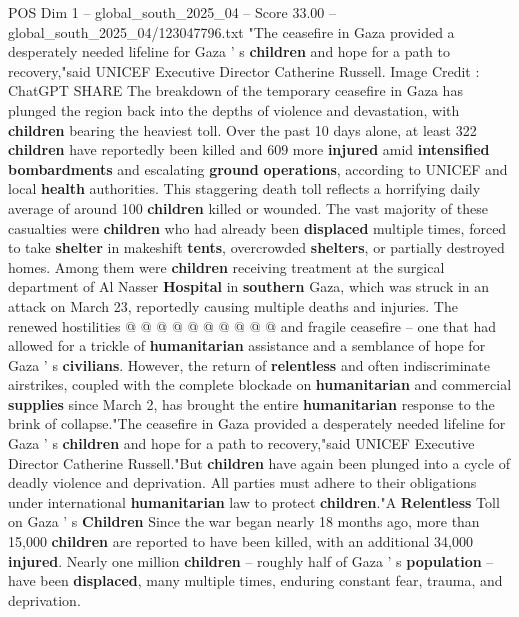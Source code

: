 \begin{textsample}{POS Dim 1 – global\_south\_2025\_04 – Score 33.00 – global\_south\_2025\_04/123047796.txt}  \label{ex:f1_pos_282}
"The ceasefire in Gaza provided a desperately needed lifeline for Gaza ' s \textbf{children} and hope for a path to recovery,"said UNICEF Executive Director Catherine Russell.
Image Credit : ChatGPT SHARE The breakdown of the temporary ceasefire in Gaza has plunged the region back into the depths of violence and devastation, with \textbf{children} bearing the heaviest toll.
Over the past 10 days alone, at least 322 \textbf{children} have reportedly been killed and 609 more \textbf{injured} amid \textbf{intensified} \textbf{bombardments} and escalating \textbf{ground} \textbf{operations}, according to UNICEF and local \textbf{health} authorities.
This staggering death toll reflects a horrifying daily average of around 100 \textbf{children} killed or wounded.
The vast majority of these casualties were \textbf{children} who had already been \textbf{displaced} multiple times, forced to take \textbf{shelter} in makeshift \textbf{tents}, overcrowded \textbf{shelters}, or partially destroyed homes.
Among them were \textbf{children} receiving treatment at the surgical department of Al Nasser \textbf{Hospital} in \textbf{southern} Gaza, which was struck in an attack on March 23, reportedly causing multiple deaths and injuries.
The renewed hostilities @ @ @ @ @ @ @ @ @ @ and fragile ceasefire -- one that had allowed for a trickle of \textbf{humanitarian} assistance and a semblance of hope for Gaza ' s \textbf{civilians}.
However, the return of \textbf{relentless} and often indiscriminate airstrikes, coupled with the complete blockade on \textbf{humanitarian} and commercial \textbf{supplies} since March 2, has brought the entire \textbf{humanitarian} response to the brink of collapse."The ceasefire in Gaza provided a desperately needed lifeline for Gaza ' s \textbf{children} and hope for a path to recovery,"said UNICEF Executive Director Catherine Russell."But \textbf{children} have again been plunged into a cycle of deadly violence and deprivation.
All parties must adhere to their obligations under international \textbf{humanitarian} law to protect \textbf{children}."A \textbf{Relentless} Toll on Gaza ' s \textbf{Children} Since the war began nearly 18 months ago, more than 15,000 \textbf{children} are reported to have been killed, with an additional 34,000 \textbf{injured}.
Nearly one million \textbf{children} -- roughly half of Gaza ' s \textbf{population} -- have been \textbf{displaced}, many multiple times, enduring constant fear, trauma, and deprivation.

\end{textsample}

